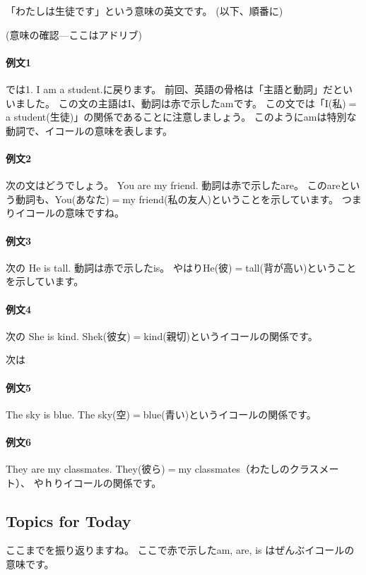 \documentclass[book,jafontscale=0.9247]{jlreq}
\begin{document}
「わたしは生徒です」という意味の英文です。
(以下、順番に)


(意味の確認---ここはアドリブ)

\paragraph{例文1}
では1. I am a student.に戻ります。
前回、英語の骨格は「主語と動詞」だといいました。
この文の主語はI、動詞は赤で示したamです。
この文では「I(私)$=$a student(生徒)」の関係であることに注意しましょう。
このようにamは特別な動詞で、イコールの意味を表します。

\paragraph{例文2}
次の文はどうでしょう。
You are my friend.
動詞は赤で示したare。
このareという動詞も、You(あなた)$=$my friend(私の友人)ということを示しています。
つまりイコールの意味ですね。

\paragraph{例文3}
次の
 He is tall.
動詞は赤で示したis。
やはりHe(彼)$=$tall(背が高い)ということを示しています。

\paragraph{例文4}
次の
She is kind.
Shek(彼女)$=$kind(親切)というイコールの関係です。

次は
\paragraph{例文5}
The sky is blue.
The sky(空)$=$blue(青い)というイコールの関係です。

\paragraph{例文6}
They are my classmates.
They(彼ら)$=$my classmates（わたしのクラスメート）、
やｈりイコールの関係です。

\bigskip

\subsection{Topics for Today}
ここまでを振り返りますね。
ここで赤で示したam, are, is はぜんぶイコールの意味です。
\end{document}
